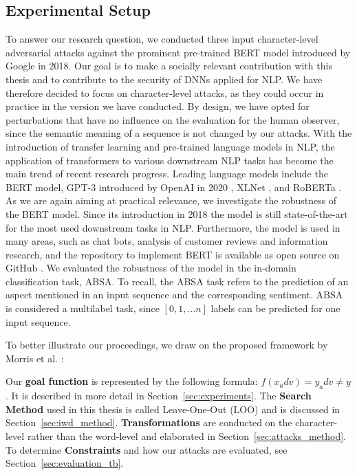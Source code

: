 \subsection{Experimental Setup} 
To answer our research question, we conducted three input character-level adversarial attacks against the prominent pre-trained BERT model introduced by Google in 2018. 
Our goal is to make a socially relevant contribution with this thesis and to contribute to the security of DNNs applied for NLP. We have therefore decided to focus on character-level attacks, as they could occur in practice in the version we have conducted. By design, we have opted for perturbations that have no influence on the evaluation for the human observer, since the semantic meaning of a sequence is not changed by our attacks. 
With the introduction of transfer learning and pre-trained language models in NLP, the application of transformers to various downstream NLP tasks has become the main trend of recent research progress. Leading language models include the BERT model, GPT-3 introduced by OpenAI in 2020 \cite{brown2020language}, XLNet \cite{yang2019xlnet}, and RoBERTa \cite{liu2019roberta}. As we are again aiming at practical relevance, we investigate the robustness of the BERT model. Since its introduction in 2018 the model is still state-of-the-art for the most used downstream tasks in NLP. Furthermore, the model is used in many areas, such as chat bots, analysis of customer reviews and information research, and the repository to implement BERT is available as open source on GitHub \cite{tum_2020}.  
We evaluated the robustness of the model in the in-domain classification task, ABSA. To recall, the ABSA task refers to the prediction of an aspect mentioned in an input sequence and the corresponding sentiment. ABSA is considered a multilabel task, since $[0,1, \dots n]$ labels can be predicted for one input sequence. 

To better illustrate our proceedings, we draw on the proposed framework by Morris et al. \cite{morris2020textattack}:

Our \textbf{goal function} is represented by the following formula: ${f( x_adv ) = y_adv \neq y}$. It is described in more detail in Section~\ref{sec:experiments}. The \textbf{Search Method} used in this thesis is called Leave-One-Out (LOO) and is discussed in Section~\ref{sec:iwd_method}. \textbf{Transformations} are conducted on the character-level rather than the word-level and elaborated in Section~\ref{sec:attacks_method}. To determine \textbf{Constraints} and how our attacks are evaluated, see Section~\ref{sec:evaluation_tb}.


